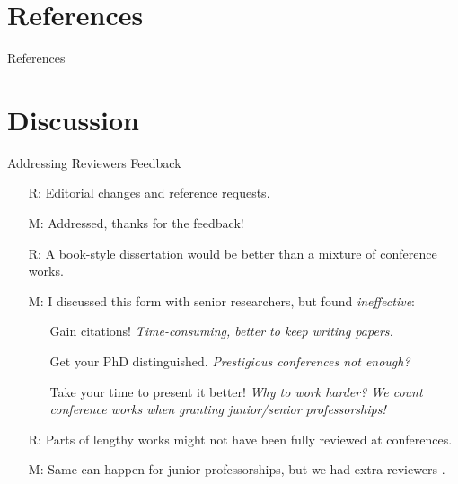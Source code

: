 \documentclass[9pt]{beamer}					%
\begin{document}
%

\section{References }

\begin{frame}[allowframebreaks]{References}
	\tiny
	
\end{frame}

\section{Discussion }

\begin{frame}{Addressing Reviewers Feedback}
\begin{itemize}
    \item[R:] Editorial changes and reference requests.
    \item[M:] Addressed, thanks for the feedback!
    \item[R:] A book-style dissertation would be better than a mixture of conference works.
    \item[M:] I discussed this form with senior researchers, but found \emph{ineffective}:
    \begin{itemize}
        \item[\emoji{carrot}] Gain citations! \emph{Time-consuming, better to keep writing papers.}
        \item[\emoji{carrot}] Get your PhD distinguished. \emph{Prestigious conferences not enough?}
        \item[\emoji{sweat-droplets}] Take your time to present it better! \emph{Why to work harder? We count conference works when granting junior/senior  professorships!} 
    \end{itemize}
    \item[R:] Parts of lengthy works might not have been fully reviewed at conferences.
    \item[M:] Same can happen for junior professorships, but we had extra reviewers .
\end{itemize}
\end{frame}
\end{document}

